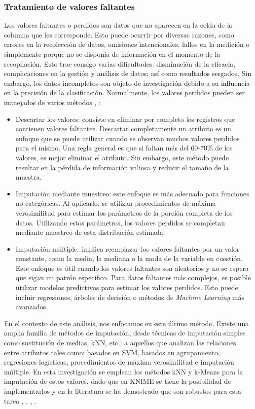 \subsubsection*{Tratamiento de valores faltantes} \label{secc:mv}
Los valores faltantes o perdidos son datos que no aparecen en la celda de la columna que les corresponde. Esto puede ocurrir por diversas razones, como errores en la recolección de datos, omisiones intencionales, fallos en la medición o simplemente porque no se disponía de información en el momento de la recopilación. Esto trae consigo varias dificultades: disminución de la eficacia, complicaciones en la gestión y análisis de datos; así como resultados sesgados. Sin embargo, los datos incompletos son objeto de investigación debido a su influencia en la precisión de la clasificación. Normalmente, los valores perdidos pueden ser manejados de varios métodos \citep{garcia2015data}, \citep{ventevogel2020construction}:
\begin{itemize}
	\item Descartar los valores: consiste en eliminar por completo los registros que contienen valores faltantes. Descartar completamente un atributo es un enfoque que se puede utilizar cuando se observan muchos valores perdidos para el mismo. Una regla general es que si faltan más del 60-70\% de los valores, es mejor eliminar el atributo. Sin embargo, este método puede resultar en la pérdida de información valiosa y reducir el tamaño de la muestra.
	\item Imputación mediante muestreo: este enfoque es más adecuado para funciones no categóricas. Al aplicarlo, se utilizan procedimientos de máxima verosimilitud para estimar los parámetros de la porción completa de los datos. Utilizando estos parámetros, los valores perdidos se completan mediante muestreo de esta distribución estimada.
	\item Imputación múltiple: implica reemplazar los valores faltantes por un valor constante, como la media, la mediana o la moda de la variable en cuestión. Este enfoque es útil cuando los valores faltantes son aleatorios y no se espera que sigan un patrón específico. Para datos faltantes más complejos, es posible utilizar modelos predictivos para estimar los valores perdidos. Esto puede incluir regresiones, árboles de decisión o métodos de \textit{Machine Learning} más avanzados.
\end{itemize}
En el contexto de este análisis, nos enfocamos en este último método. Existe una amplia familia de métodos de imputación, desde técnicas de imputación simples como sustitución de medias, kNN, etc.; a aquellos que analizan las relaciones entre atributos tales como: basados en SVM, basados en agrupamiento, regresiones logísticas, procedimientos de máxima verosimilitud e imputación múltiple. En esta investigación se emplean los métodos kNN y k-Means para la imputación de estos valores, dado que en KNIME se tiene la posibilidad de implementarlos y en la literatura se ha demostrado que son robustos para esta tarea \citep{tsai2022empirical}, \citep{batista2003analysis}, \citep{patil2010missing}, \citep{li2004towards}.\\
